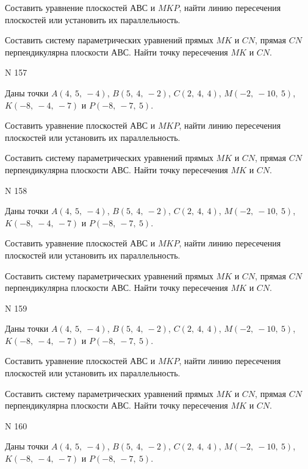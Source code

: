 \documentclass[11pt]{report}
\begin{document}
Составить уравнение плоскостей $АВС$ и $MKP$,
найти линию пересечения плоскостей или установить их параллельность.

Составить систему параметрических уравнений прямых $MK$ и $CN$,
прямая $CN$ перпендикулярна плоскости $АВС$. 
Найти точку пересечения $MK$ и $CN$.



 N 157

Даны точки $A\left( 4, \  5, \  -4\right)$, $B\left( 5, \  4, \  -2\right)$, $C\left( 2, \  4, \  4\right)$, $M\left( -2, \  -10, \  5\right)$, $K\left( -8, \  -4, \  -7\right)$ и $P\left( -8, \  -7, \  5\right)$.


Составить уравнение плоскостей $АВС$ и $MKP$,
найти линию пересечения плоскостей или установить их параллельность.

Составить систему параметрических уравнений прямых $MK$ и $CN$,
прямая $CN$ перпендикулярна плоскости $АВС$. 
Найти точку пересечения $MK$ и $CN$.



 N 158

Даны точки $A\left( 4, \  5, \  -4\right)$, $B\left( 5, \  4, \  -2\right)$, $C\left( 2, \  4, \  4\right)$, $M\left( -2, \  -10, \  5\right)$, $K\left( -8, \  -4, \  -7\right)$ и $P\left( -8, \  -7, \  5\right)$.


Составить уравнение плоскостей $АВС$ и $MKP$,
найти линию пересечения плоскостей или установить их параллельность.

Составить систему параметрических уравнений прямых $MK$ и $CN$,
прямая $CN$ перпендикулярна плоскости $АВС$. 
Найти точку пересечения $MK$ и $CN$.



 N 159

Даны точки $A\left( 4, \  5, \  -4\right)$, $B\left( 5, \  4, \  -2\right)$, $C\left( 2, \  4, \  4\right)$, $M\left( -2, \  -10, \  5\right)$, $K\left( -8, \  -4, \  -7\right)$ и $P\left( -8, \  -7, \  5\right)$.


Составить уравнение плоскостей $АВС$ и $MKP$,
найти линию пересечения плоскостей или установить их параллельность.

Составить систему параметрических уравнений прямых $MK$ и $CN$,
прямая $CN$ перпендикулярна плоскости $АВС$. 
Найти точку пересечения $MK$ и $CN$.



 N 160

Даны точки $A\left( 4, \  5, \  -4\right)$, $B\left( 5, \  4, \  -2\right)$, $C\left( 2, \  4, \  4\right)$, $M\left( -2, \  -10, \  5\right)$, $K\left( -8, \  -4, \  -7\right)$ и $P\left( -8, \  -7, \  5\right)$.
\end{document}
